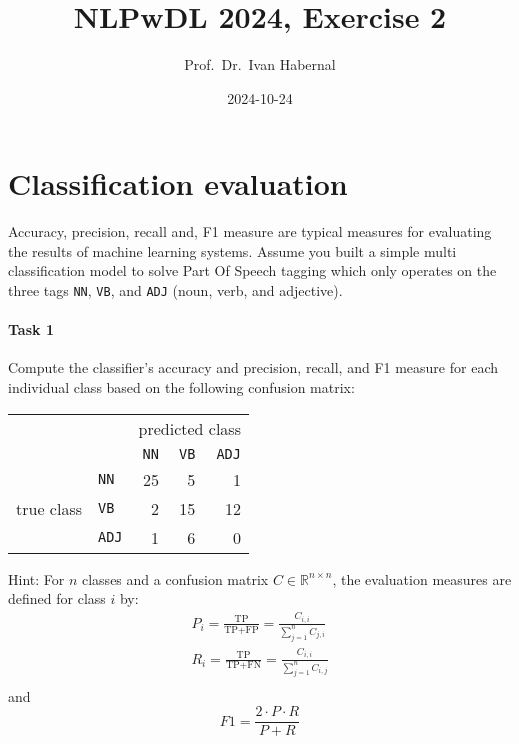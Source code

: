 \documentclass[11pt,a4wide,oneside]{article}
\title{NLPwDL 2024, Exercise 2}
\author{Prof.\ Dr.\ Ivan Habernal}
\date{2024-10-24}
\begin{document}
\maketitle

\section{Classification evaluation}

Accuracy, precision, recall and, F1 measure are typical measures for evaluating the results of machine learning systems.
Assume you built a simple multi classification model to solve Part Of Speech tagging which only operates on the three tags \texttt{NN}, \texttt{VB}, and \texttt{ADJ} (noun, verb, and adjective).


\paragraph{Task 1}
Compute the classifier's accuracy and precision, recall, and F1 measure for each individual class based on the following confusion matrix:
\begin{table}[h]
	\centering
	\begin{tabular}{ll|rrr}
		&				& \multicolumn{3}{c}{predicted class} \\
		&				& \texttt{NN}	& \texttt{VB}	& \texttt{ADJ} \\
		\cline{2-5}
		& \texttt{NN}	& 25			& 5				& 1 \\
		true class		& \texttt{VB}	& 2				& 15			& 12 \\
		& \texttt{ADJ}	& 1				& 6				& 0 \\
	\end{tabular}
\end{table}

Hint: For $n$ classes and a confusion matrix $C \in \mathbb{R}^{n \times n}$, the evaluation measures are defined for class $i$ by:
\begin{align*}
	P_i = \frac{\text{TP}}{\text{TP+FP}} = \frac{C_{i,i}}{\sum_{j=1}^n C_{j,i}} \\
	R_i = \frac{\text{TP}}{\text{TP+FN}} = \frac{C_{i,i}}{\sum_{j=1}^n C_{i,j}} \\
\end{align*}
and
\[\mathit{F1} = \frac{2 \cdot P \cdot R}{P + R}\]
\end{document}
